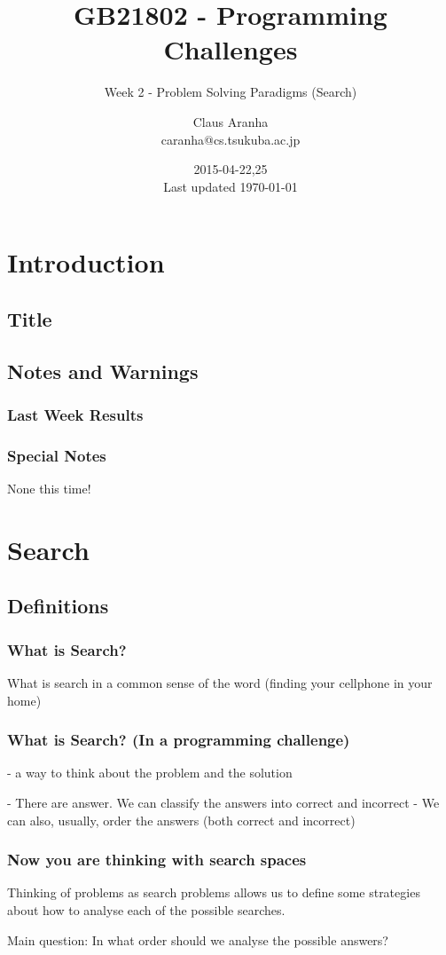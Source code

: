\documentclass{beamer}
\title[GB21802]{GB21802 - Programming Challenges}
\subtitle[]{Week 2 - Problem Solving Paradigms (Search)}
\author[Claus Aranha]{Claus Aranha\\{\footnotesize caranha@cs.tsukuba.ac.jp}}
\institute{College of Information Science}
\date{2015-04-22,25\\{\tiny Last updated \today}}
\begin{document}
\section{Introduction}
\subsection{Title}
\begin{frame}
\maketitle
\end{frame}

\subsection{Notes and Warnings}

\begin{frame}
  \frametitle{Last Week Results}
\end{frame}

\begin{frame}
  \frametitle{Special Notes}
  None this time!
\end{frame}

\section{Search}

\subsection{Definitions}
\begin{frame}
  \frametitle{What is Search?}
  What is search in a common sense of the word 
  (finding your cellphone in your home)
\end{frame}

\begin{frame}
  \frametitle{What is Search? (In a programming challenge)}
  - a way to think about the problem and the solution

  - There are answer. We can classify the answers into correct and incorrect
  - We can also, usually, order the answers (both correct and incorrect)
\end{frame}

\begin{frame}
  \frametitle{Now you are thinking with search spaces}
  Thinking of problems as search problems allows us to define 
  some strategies about how to analyse each of the possible searches.

  Main question: In what order should we analyse the possible answers?
\end{frame}
\end{document}
